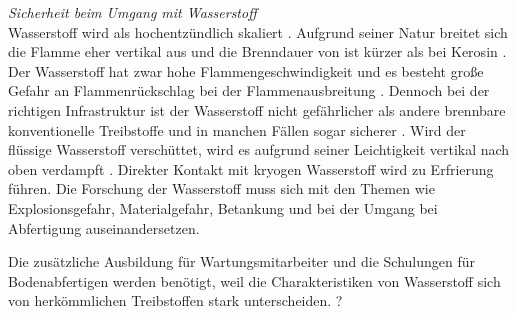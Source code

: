 



\textit{Sicherheit beim Umgang mit Wasserstoff}\\
Wasserstoff wird als hochentzündlich skaliert \cite{dalmia2022powering}. Aufgrund seiner Natur breitet sich die Flamme eher 
vertikal aus und die Brenndauer von  ist kürzer als bei Kerosin \cite{colpan2022fuel}.
Der Wasserstoff hat zwar hohe Flammengeschwindigkeit und es besteht große Gefahr an Flammenrückschlag bei der Flammenausbreitung \cite{khandelwal2013hydrogen}.
Dennoch bei der richtigen Infrastruktur ist der Wasserstoff nicht gefährlicher als andere brennbare konventionelle Treibstoffe und in manchen 
Fällen sogar sicherer \cite{khandelwal2013hydrogen}. 
Wird der flüssige Wasserstoff verschüttet, wird es aufgrund seiner Leichtigkeit vertikal nach oben verdampft \cite{colpan2022fuel}. 
Direkter Kontakt mit kryogen Wasserstoff wird zu Erfrierung führen.
Die Forschung der Wasserstoff muss sich mit den Themen wie Explosionsgefahr, Materialgefahr, Betankung und 
bei der Umgang bei Abfertigung auseinandersetzen. 


Die zusätzliche Ausbildung für Wartungsmitarbeiter und die Schulungen für Bodenabfertigen
werden benötigt, weil die Charakteristiken von Wasserstoff 
sich von herkömmlichen Treibstoffen stark unterscheiden. \cite{mulder2019outlook}?


